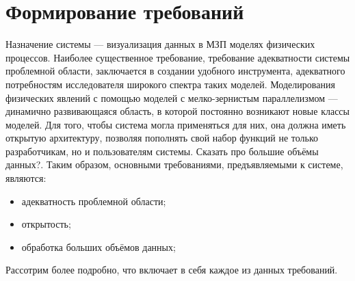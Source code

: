\documentclass[a4paper,12pt]{extarticle}
\let\stdsection\section
\renewcommand\section{
    \newpage
    \stdsection
}
\begin{document}
\section{Формирование требований}
\label{sec:requirements}

Назначение системы — визуализация данных в МЗП моделях физических процессов.  Наиболее существенное требование, требование адекватности системы проблемной области, заключается в создании удобного инструмента, адекватного потребностям исследователя широкого спектра таких моделей.  Моделирования физических явлений с помощью моделей с мелко-зернистым параллелизмом — динамично развивающаяся область, в которой постоянно возникают новые классы моделей. Для того, чтобы система могла применяться для них, она должна иметь открытую архитектуру, позволяя пополнять свой набор функций не только разработчикам, но и пользователям системы. Сказать про большие объёмы данных?. Таким образом, основными требованиями, предъявляемыми к системе, являются:
\begin{itemize}
    \item адекватность проблемной области;
    \item открытость;
    \item обработка больших объёмов данных;
\end{itemize}

Рассотрим более подробно, что включает в себя каждое из данных требований.
\end{document}
